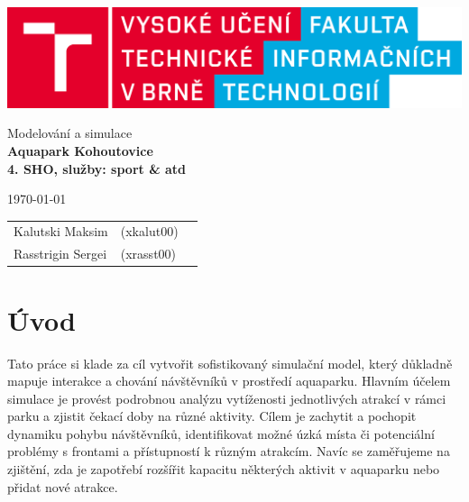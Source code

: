\documentclass[a4paper, 11pt]{article}
\begin{document}
    \begin{titlepage}
        \begin{center}
            \includegraphics[width=0.77\linewidth]{logo_cz.png} \\


            \Huge{Modelování a simulace} \\
      \LARGE{\textbf{Aquapark Kohoutovice}} \\
         \LARGE{\textbf{4. SHO, služby: sport \& atd}} \\

        \end{center}

        \vfill

        \begin{minipage}{0.4\textwidth}
            \Large \today
        \end{minipage}
        \begin{minipage}[b]{0.5\textwidth}
            \begin{flushright}
                \Large
                \begin{tabular}{l l l}
        Kalutski Maksim & (xkalut00) \\
        Rasstrigin Sergei & (xrasst00) \\
      \end{tabular}
            \end{flushright}
        \end{minipage}
    \end{titlepage}

    \setcounter{page}{1}
    \tableofcontents
    \clearpage


    \setcounter{page}{1}

    \section{Úvod}
    Tato práce si klade za cíl vytvořit sofistikovaný simulační model, který důkladně mapuje interakce a chování návštěvníků v prostředí aquaparku. Hlavním účelem simulace je provést podrobnou analýzu vytíženosti jednotlivých atrakcí v rámci parku a zjistit čekací doby na různé aktivity. Cílem je zachytit a pochopit dynamiku pohybu návštěvníků, identifikovat možné úzká místa či potenciální problémy s frontami a přístupností k různým atrakcím. Navíc se zaměřujeme na zjištění, zda je zapotřebí rozšířit kapacitu některých aktivit v aquaparku nebo přidat nové atrakce.
\end{document}
